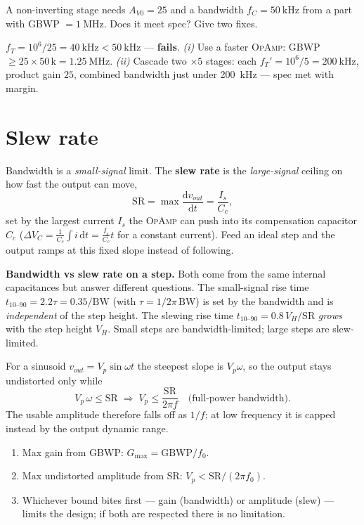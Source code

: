 \documentclass[11pt,a4paper,oneside]{book}
\newcommand{\op}{\textsc{OpAmp}}
\begin{document}
\begin{exercise}
A non-inverting stage needs $A_{V0}=25$ and a bandwidth $f_C=\qty{50}{\kilo\hertz}$
from a part with GBWP $=\qty{1}{\mega\hertz}$. Does it meet spec? Give two fixes.
\end{exercise}
\begin{solution}
$f_T=10^6/25=\qty{40}{\kilo\hertz}<\qty{50}{\kilo\hertz}$ --- \textbf{fails}.
\emph{(i)} Use a faster \op{}: GBWP $\ge25\times50\,\text{k}=\qty{1.25}{\mega\hertz}$.
\emph{(ii)} Cascade two $\times5$ stages: each $f_T'=10^6/5=\qty{200}{\kilo\hertz}$,
product gain $25$, combined bandwidth just under \qty{200}{\kilo\hertz} --- spec
met with margin.
\end{solution}

\section{Slew rate}
Bandwidth is a \emph{small-signal} limit. The \textbf{slew rate} is the
\emph{large-signal} ceiling on how fast the output can move,
\[
  \text{SR}=\max\frac{\mathrm{d}v_{out}}{\mathrm{d}t}=\frac{I_s}{C_c},
\]
set by the largest current $I_s$ the \op{} can push into its compensation
capacitor $C_c$ ($\Delta V_C=\tfrac{1}{C_c}\!\int\! i\,\mathrm{d}t=\tfrac{I_s}{C_c}t$
for a constant current). Feed an ideal step and the output ramps at this fixed
slope instead of following.

\begin{note}
\textbf{Bandwidth vs slew rate on a step.} Both come from the same internal
capacitances but answer different questions. The small-signal rise time
$t_{10\text{--}90}=2.2\tau=0.35/\text{BW}$ (with $\tau=1/2\pi\,\text{BW}$) is set by
the bandwidth and is \emph{independent} of the step height. The slewing rise time
$t_{10\text{--}90}=0.8\,V_H/\text{SR}$ \emph{grows} with the step height $V_H$.
Small steps are bandwidth-limited; large steps are slew-limited.
\end{note}

For a sinusoid $v_{out}=V_p\sin\omega t$ the steepest slope is $V_p\omega$, so the
output stays undistorted only while
\[
  V_p\,\omega\le\text{SR}\;\Longrightarrow\;V_p\le\frac{\text{SR}}{2\pi f}
  \quad\text{(full-power bandwidth).}
\]
The usable amplitude therefore falls off as $1/f$; at low frequency it is capped
instead by the output dynamic range.

\begin{protocol}
\begin{enumerate}[leftmargin=1.5cm]
  \item Max gain from GBWP: $G_{\max}=\text{GBWP}/f_0$.
  \item Max undistorted amplitude from SR: $V_p<\text{SR}/(2\pi f_0)$.
  \item Whichever bound bites first --- gain (bandwidth) or amplitude (slew) ---
        limits the design; if both are respected there is no limitation.
\end{enumerate}
\end{protocol}
\end{document}
